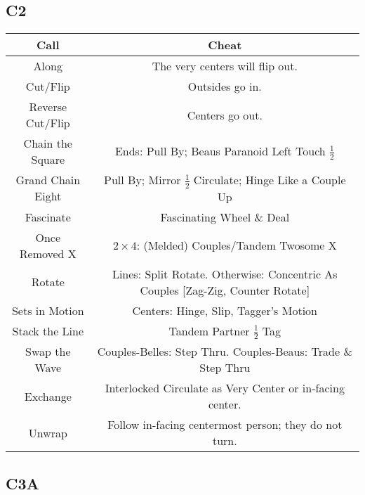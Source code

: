\documentclass{article}
\begin{document}
\subsection*{C2}
\begin{center}
  \begin{tabular}{c | c}
    Call & Cheat \\ \hline
    Along & The very centers will flip out. \\
    Cut/Flip & Outsides go in. \\
    Reverse Cut/Flip & Centers go out. \\
    Chain the Square & Ends: Pull By; Beaus Paranoid Left Touch $\frac12$ \\
    Grand Chain Eight & Pull By; Mirror $\frac12$ Circulate; Hinge Like a Couple Up \\
    Fascinate & Fascinating Wheel \& Deal \\
    Once Removed X & $2\times4$: (Melded) Couples/Tandem Twosome X \\
    Rotate & Lines: Split Rotate.  Otherwise: Concentric As Couples [Zag-Zig, Counter Rotate] \\
    Sets in Motion & Centers: Hinge, Slip, Tagger's Motion \\
    Stack the Line & Tandem Partner $\frac12$ Tag \\
    Swap the Wave & Couples-Belles: Step Thru.  Couples-Beaus: Trade \& Step Thru \\
    Exchange & Interlocked Circulate as Very Center or in-facing center. \\
    Unwrap & Follow in-facing centermost person; they do not turn. \\
  \end{tabular}
\end{center}

\subsection*{C3A}
\end{document}
